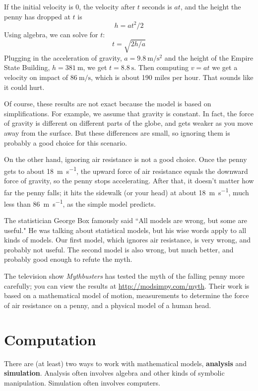 \documentclass[12pt]{book}
\theoremstyle{exercise}
\begin{document}
If the initial velocity is 0, the velocity after $t$ seconds is $at$, and the height the penny has dropped at $t$ is
%
\[ h = at^2/2 \]
%
Using algebra, we can solve for $t$:
%
\[ t = \sqrt{2h/a} \]
%
Plugging in the acceleration of gravity, $a = \SI{9.8}{\meter\per\second\squared}$ and the height of the Empire State Building, $h=\SI{381}{\meter}$, we get $t = \SI{8.8}{\second}$.  Then computing $v=at$ we get a velocity on impact of $\SI{86}{\meter\per\second}$, which is about 190 miles per hour.  That sounds like it could hurt.

Of course, these results are not exact because the model is based on simplifications.  For example, we assume that gravity is constant.  In fact, the force of gravity is different on different parts of the globe, and gets weaker as you move away from the surface.  But these differences are small, so ignoring them is probably a good choice for this scenario.

On the other hand, ignoring air resistance is not a good choice.  Once the penny gets to about \SI{18}{\meter\per\second}, the upward force of air resistance equals the downward force of gravity, so the penny stops accelerating.  After that, it doesn't matter how far the penny falls; it hits the sidewalk (or your head) at about \SI{18}{\meter\per\second}, much less than \SI{86}{\meter\per\second}, as the simple model predicts.

The statistician George Box famously said ``All models are wrong, but some are useful."  He was talking about statistical models, but his wise words apply to all kinds of models.  Our first model, which ignores air resistance, is very wrong, and probably not useful.  The second model is also wrong, but much better, and probably good enough to refute the myth.

The television show {\it Mythbusters} has tested the myth of the falling penny more carefully; you can view the results at \url{http://modsimpy.com/myth}.  Their work is based on a mathematical model of motion, measurements to determine the force of air resistance on a penny, and a physical model of a human head.


\section{Computation}

There are (at least) two ways to work with mathematical models, {\bf analysis} and {\bf simulation}.  Analysis often involves algebra and other kinds of symbolic manipulation.  Simulation often involves computers.
\end{document}
